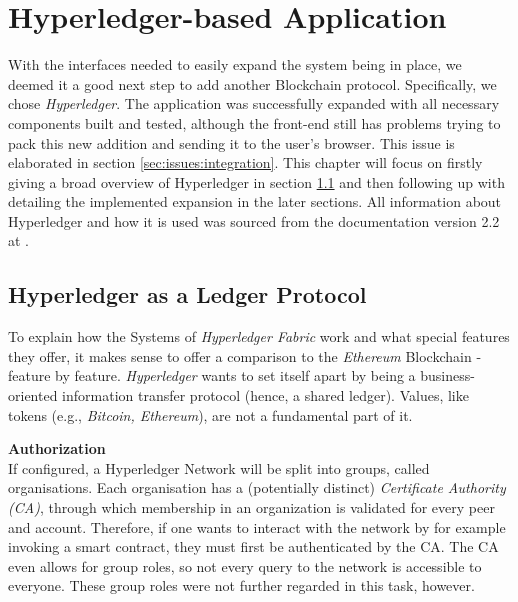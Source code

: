 %
\section{Hyperledger-based Application}
\label{sec:impr:hl}



With the interfaces needed to easily expand the system being in place, we deemed it a good next step to add another Blockchain protocol. Specifically, we chose \emph{Hyperledger}. The application was successfully expanded with all necessary components built and tested, although the front-end still has problems trying to pack this new addition and sending it to the user's browser. This issue is elaborated in section \ref{sec:issues:integration}. This chapter will focus on firstly giving a broad overview of Hyperledger in section \ref{sec:impr:hl:basics} and then following up with detailing the implemented expansion in the later sections. \newline
All information about Hyperledger and how it is used was sourced from the documentation version 2.2 at \cite{hyperledger}.

\subsection{Hyperledger as a Ledger Protocol}
\label{sec:impr:hl:basics}

To explain how the Systems of \emph{Hyperledger Fabric} work and what special features they offer, it makes sense to offer a comparison to the \emph{Ethereum} Blockchain - feature by feature. \emph{Hyperledger} wants to set itself apart by being a business-oriented information transfer protocol (hence, a shared ledger). Values, like tokens (e.g., \emph{Bitcoin, Ethereum}), are not a fundamental part of it.

\textbf{Authorization} \\[0.2em]
If configured, a Hyperledger Network will be split into groups, called organisations. Each organisation has a (potentially distinct) \emph{Certificate Authority (CA)}, through which membership in an organization is validated for every peer and account. Therefore, if one wants to interact with the network by for example invoking a smart contract, they must first be authenticated  by the CA. The CA even allows for group roles, so not every query to the network is accessible to everyone. These group roles were not further regarded in this task, however.

